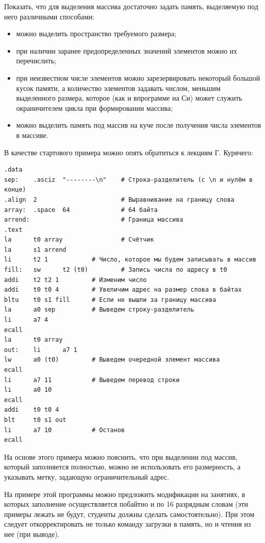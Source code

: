 Показать, что для выделения массива достаточно задать память, выделяемую под него различными способами:
\begin{itemize}
    \item можно выделить пространство требуемого размера;
    \item при наличии заранее предопределенных значений элементов можно их перечислить;
    \item при неизвестном числе элементов можно зарезервировать некоторый большой кусок памяти, а количество элементов задавать числом, меньшим выделенного размера, которое (как и впрограмме на Си) может служить окраничителем цикла при формировании массива;
    \item можно выделить память под массив на куче после получения числа элементов в массиве.
\end{itemize}
В качестве стартового примера можно опять обратиться к лекциям Г. Курячего:
\begin{verbatim}
.data
sep:    .asciz  "--------\n"    # Строка-разделитель (с \n и нулём в конце)
.align  2                       # Выравнивание на границу слова
array:  .space  64              # 64 байта
arrend:                         # Граница массива
.text
la      t0 array                # Счётчик
la      s1 arrend
li      t2 1            # Число, которое мы будем записывать в массив
fill:   sw      t2 (t0)         # Запись числа по адресу в t0
addi    t2 t2 1         # Изменим число
addi    t0 t0 4         # Увеличим адрес на размер слова в байтах
bltu    t0 s1 fill      # Если не вышли за границу массива
la      a0 sep          # Выведем строку-разделитель
li      a7 4
ecall
la      t0 array
out:    li      a7 1
lw      a0 (t0)         # Выведем очередной элемент массива
ecall
li      a7 11           # Выведем перевод строки
li      a0 10
ecall
addi    t0 t0 4
blt     t0 s1 out
li      a7 10           # Останов
ecall
\end{verbatim}
На основе этого примера можно пояснить, что при выделении под массив, который заполняется полностью, можно не использовать его размерность, а указывать метку, задающую ограничительный адрес.

На примере этой программы можно предложить модификации на занятиях, в которых заполнение осуществляется побайтно и по 16 разрядным словам (эти примеры лежать не будут, студенты должны сделать самостоятельно). При этом следует откорректировать не только команду загрузки в память, но и чтения из нее (при выводе).

